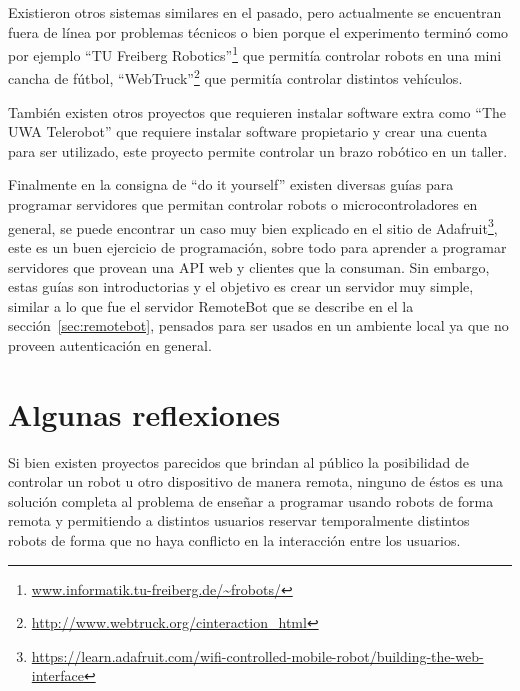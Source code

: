 
Existieron otros sistemas similares en el pasado, pero actualmente se
encuentran fuera de línea por problemas técnicos o bien porque el
experimento terminó como por ejemplo
``TU Freiberg Robotics''\footnote{\url{www.informatik.tu-freiberg.de/\~frobots/}}
que permitía controlar robots en una mini cancha de fútbol,
``WebTruck''\footnote{\url{http://www.webtruck.org/cinteraction_html}} que
permitía controlar distintos vehículos.

También existen otros proyectos que requieren instalar software extra
como ``The UWA Telerobot'' que requiere instalar software propietario
y crear una cuenta para ser utilizado, este proyecto permite controlar
un brazo robótico en un taller.

Finalmente en la consigna de ``do it yourself'' existen diversas guías para
programar servidores que permitan controlar robots o microcontroladores
en general, se puede encontrar un caso muy bien explicado en el sitio
de Adafruit\footnote{\url{https://learn.adafruit.com/wifi-controlled-mobile-robot/building-the-web-interface}},
este es un buen ejercicio de programación, sobre todo para aprender a
programar servidores que provean una API web y clientes que la consuman. Sin
embargo, estas guías son introductorias y el objetivo es crear un servidor
muy simple, similar a lo que fue el servidor RemoteBot que se describe
en el la sección~\ref{sec:remotebot},
pensados para ser
usados en un ambiente local ya que no proveen autenticación en general.

\section{Algunas reflexiones}

Si bien existen proyectos parecidos que brindan al público la posibilidad
de controlar un robot u otro dispositivo de manera remota, ninguno de
éstos es una solución
completa al problema de enseñar a programar usando
robots de forma remota y permitiendo a distintos usuarios reservar
temporalmente distintos
robots de forma que no haya conflicto en la interacción entre los usuarios.
